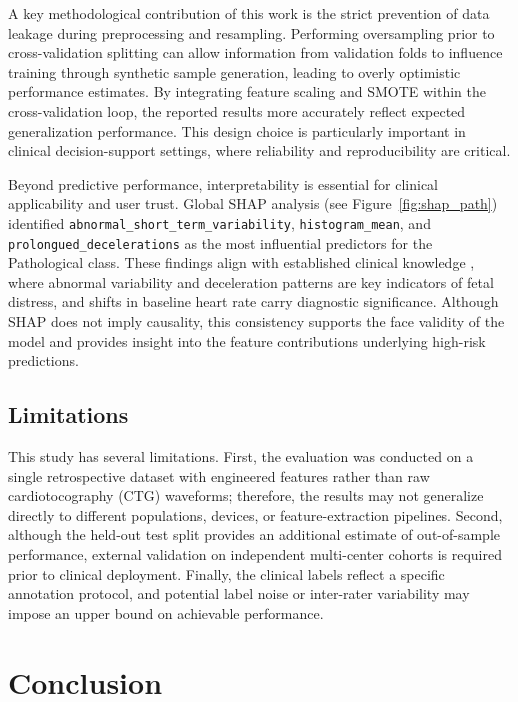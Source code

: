 \documentclass[sigconf]{acmart}
\begin{document}
A key methodological contribution of this work is the strict prevention of data leakage during preprocessing and resampling. Performing oversampling prior to cross-validation splitting can allow information from validation folds to influence training through synthetic sample generation, leading to overly optimistic performance estimates. By integrating feature scaling and SMOTE within the cross-validation loop, the reported results more accurately reflect expected generalization performance. This design choice is particularly important in clinical decision-support settings, where reliability and reproducibility are critical.

Beyond predictive performance, interpretability is essential for clinical applicability and user trust. Global SHAP analysis (see Figure~\ref{fig:shap_path}) identified \texttt{abnormal\_short\_term\_variability}, \texttt{histogram\_mean}, and \texttt{prolongued\_decelerations} as the most influential predictors for the Pathological class. These findings align with established clinical knowledge \cite{ayres2015}, where abnormal variability and deceleration patterns are key indicators of fetal distress, and shifts in baseline heart rate carry diagnostic significance. Although SHAP does not imply causality, this consistency supports the face validity of the model and provides insight into the feature contributions underlying high-risk predictions.

\subsection{Limitations}
\label{subsec:limitations}
This study has several limitations. First, the evaluation was conducted on a single retrospective dataset with engineered features rather than raw cardiotocography (CTG) waveforms; therefore, the results may not generalize directly to different populations, devices, or feature-extraction pipelines. Second, although the held-out test split provides an additional estimate of out-of-sample performance, external validation on independent multi-center cohorts is required prior to clinical deployment. Finally, the clinical labels reflect a specific annotation protocol, and potential label noise or inter-rater variability may impose an upper bound on achievable performance.

\section{Conclusion}
\label{sec:conclusion}
\end{document}
